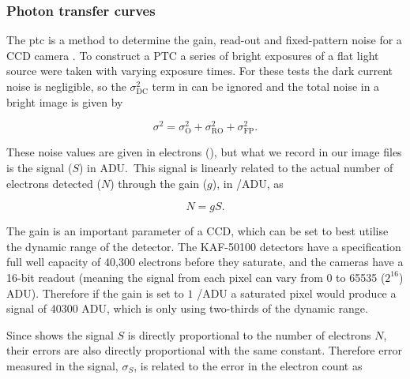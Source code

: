\begin{colsection}
\begin{colsection}
\newpage
\subsubsection{Photon transfer curves}


The \gls{ptc} is a method to determine the gain, read-out and fixed-pattern noise for a CCD camera \citep{PTC}. To construct a PTC a series of bright exposures of a flat light source were taken with varying exposure times. For these tests the dark current noise is negligible, so the $\sigma_\text{DC}^2$ term in  can be ignored and the total noise in a bright image is given by

\begin{equation}
    \sigma^2 = \sigma_\text{O}^2 + \sigma_\text{RO}^2 + \sigma_\text{FP}^2.
    \label{eq:ptc_noise1}
\end{equation}

These noise values are given in electrons (\elec), but what we record in our image files is the signal ($S$) in ADU.\ This signal is linearly related to the actual number of electrons detected ($N$) through the gain ($g$), in \elec/ADU, as

\begin{equation}
    N = g S.
    \label{eq:gain}
\end{equation}

The gain is an important parameter of a CCD, which can be set to best utilise the dynamic range of the detector. The KAF-50100 detectors have a specification full well capacity of 40,300 electrons before they saturate, and the cameras have a 16-bit readout (meaning the signal from each pixel can vary from 0 to 65535 ($2^{16}$) ADU). Therefore if the gain is set to $1$ \elec/ADU a saturated pixel would produce a signal of 40300 ADU, which is only using two-thirds of the dynamic range.

Since  shows the signal $S$ is directly proportional to the number of electrons $N$, their errors are also directly proportional with the same constant. Therefore error measured in the signal, $\sigma_S$, is related to the error in the electron count as


\end{colsection}
\end{colsection}
